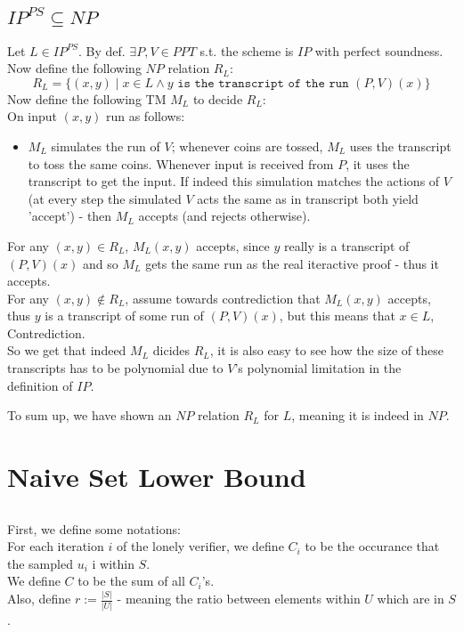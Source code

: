 \documentclass{article}
\begin{document}
\subsection{$IP^{PS}\subseteq NP$}
Let $L\in IP^{PS}$. By def. $\exists P,V\in PPT$ s.t. the scheme is $IP$ with
perfect soundness.\\
Now define the following $NP$ relation $R_L$:
\[
    R_L=\{(x,y)\mid x\in L \wedge y\texttt{ is the transcript of the run } (P,V)(x)\}
\]
Now define the following TM $M_L$ to decide $R_L$:\\
On input $(x,y)$ run as follows:
\begin{itemize}
    \item $M_L$ simulates the run of $V$; whenever coins are tossed,
    $M_L$ uses the transcript to toss the same coins. Whenever input is received from $P$,
    it uses the transcript to get the input. If indeed this simulation matches
    the actions of $V$ (at every step the simulated $V$ acts the same as in transcript both yield 'accept')
    - then $M_L$ accepts (and rejects otherwise).
\end{itemize}
For any $(x,y)\in R_L$, $M_L(x,y)$ accepts, since
$y$ really is a transcript of $(P,V)(x)$ and so $M_L$ gets the same run as the real
iteractive proof - thus it accepts.\\
For any $(x,y)\notin R_L$, assume towards contrediction that $M_L(x,y)$ accepts,
thus $y$ is a transcript of some run of $(P,V)(x)$, but this means that $x\in L$, Contrediction.\\

So we get that indeed $M_L$ dicides $R_L$, it is also easy to see how the size of
these transcripts has to be polynomial due to $V$'s polynomial limitation in the definition of $IP$.

To sum up, we have shown an $NP$ relation $R_L$ for $L$, meaning it is indeed in $NP$.


\section{Naive Set Lower Bound}
\subsection{}
First, we define some notations:\\
For each iteration  $i$ of the lonely verifier, 
we define $C_i$ to be the occurance that the sampled $u_i$ i within $S$.\\
We define $C$ to be the sum of all $C_i$'s.\\
Also, define $r:=\frac{|S|}{|U|}$ - meaning the ratio between
elements within $U$ which are in $S$.\\
\end{document}
